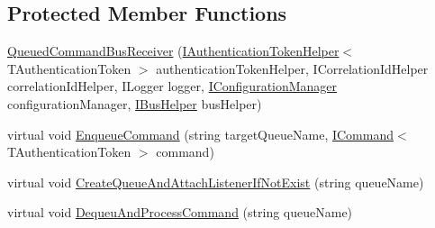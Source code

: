 \subsection*{Protected Member Functions}
\begin{DoxyCompactItemize}
\item 
\hyperlink{classCqrs_1_1Bus_1_1QueuedCommandBusReceiver_aa5158357f8e2007f06b640d4a4129781}{Queued\+Command\+Bus\+Receiver} (\hyperlink{interfaceCqrs_1_1Authentication_1_1IAuthenticationTokenHelper}{I\+Authentication\+Token\+Helper}$<$ T\+Authentication\+Token $>$ authentication\+Token\+Helper, I\+Correlation\+Id\+Helper correlation\+Id\+Helper, I\+Logger logger, \hyperlink{interfaceCqrs_1_1Configuration_1_1IConfigurationManager}{I\+Configuration\+Manager} configuration\+Manager, \hyperlink{interfaceCqrs_1_1Bus_1_1IBusHelper}{I\+Bus\+Helper} bus\+Helper)
\item 
virtual void \hyperlink{classCqrs_1_1Bus_1_1QueuedCommandBusReceiver_ab27ff7119814cdc22bf9a5811340e4e7}{Enqueue\+Command} (string target\+Queue\+Name, \hyperlink{interfaceCqrs_1_1Commands_1_1ICommand}{I\+Command}$<$ T\+Authentication\+Token $>$ command)
\item 
virtual void \hyperlink{classCqrs_1_1Bus_1_1QueuedCommandBusReceiver_ad703e46b4a8318debac37ea747163f30}{Create\+Queue\+And\+Attach\+Listener\+If\+Not\+Exist} (string queue\+Name)
\item 
virtual void \hyperlink{classCqrs_1_1Bus_1_1QueuedCommandBusReceiver_a6e00e819b9738c694fd05815938cb433}{Dequeu\+And\+Process\+Command} (string queue\+Name)
\end{DoxyCompactItemize}
